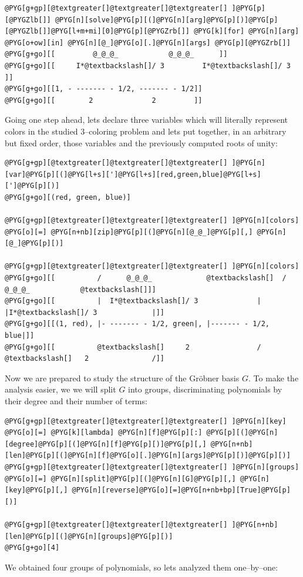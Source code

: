 \begin{Verbatim}[commandchars=@\[\]]
@PYG[g+gp][@textgreater[]@textgreater[]@textgreater[] ]@PYG[p][@PYGZlb[]] @PYG[n][solve]@PYG[p][(]@PYG[n][arg]@PYG[p][)]@PYG[p][@PYGZlb[]]@PYG[l+m+mi][0]@PYG[p][@PYGZrb[]] @PYG[k][for] @PYG[n][arg] @PYG[o+ow][in] @PYG[n][@_]@PYG[o][.]@PYG[n][args] @PYG[p][@PYGZrb[]]
@PYG[g+go][[         @_@_@_            @_@_@_      ]]
@PYG[g+go][[     I*@textbackslash[]/ 3         I*@textbackslash[]/ 3       ]]
@PYG[g+go][[1, - ------- - 1/2, ------- - 1/2]]
@PYG[g+go][[        2              2         ]]
\end{Verbatim}
\noindent
Going one step ahead, lets declare three variables which will literally represent colors in the studied
$3$--coloring problem and lets put together, in an arbitrary but fixed order, those variables and the
previously computed roots of unity:

\begin{Verbatim}[commandchars=@\[\]]
@PYG[g+gp][@textgreater[]@textgreater[]@textgreater[] ]@PYG[n][var]@PYG[p][(]@PYG[l+s][']@PYG[l+s][red,green,blue]@PYG[l+s][']@PYG[p][)]
@PYG[g+go][(red, green, blue)]

@PYG[g+gp][@textgreater[]@textgreater[]@textgreater[] ]@PYG[n][colors] @PYG[o][=] @PYG[n+nb][zip]@PYG[p][(]@PYG[n][@_@_]@PYG[p][,] @PYG[n][@_]@PYG[p][)]

@PYG[g+gp][@textgreater[]@textgreater[]@textgreater[] ]@PYG[n][colors]
@PYG[g+go][[          /      @_@_@_             @textbackslash[]  /    @_@_@_            @textbackslash[]]]
@PYG[g+go][[          |  I*@textbackslash[]/ 3              |  |I*@textbackslash[]/ 3             |]]
@PYG[g+go][[(1, red), |- ------- - 1/2, green|, |------- - 1/2, blue|]]
@PYG[g+go][[          @textbackslash[]     2                /  @textbackslash[]   2               /]]
\end{Verbatim}
\noindent
Now we are prepared to study the structure of the Gröbner basis $G$. To make the analysis easier, we
we will split $G$ into groups, discriminating polynomials by their degree and their number of terms:

\begin{Verbatim}[commandchars=@\[\]]
@PYG[g+gp][@textgreater[]@textgreater[]@textgreater[] ]@PYG[n][key] @PYG[o][=] @PYG[k][lambda] @PYG[n][f]@PYG[p][:] @PYG[p][(]@PYG[n][degree]@PYG[p][(]@PYG[n][f]@PYG[p][)]@PYG[p][,] @PYG[n+nb][len]@PYG[p][(]@PYG[n][f]@PYG[o][.]@PYG[n][args]@PYG[p][)]@PYG[p][)]
@PYG[g+gp][@textgreater[]@textgreater[]@textgreater[] ]@PYG[n][groups] @PYG[o][=] @PYG[n][split]@PYG[p][(]@PYG[n][G]@PYG[p][,] @PYG[n][key]@PYG[p][,] @PYG[n][reverse]@PYG[o][=]@PYG[n+nb+bp][True]@PYG[p][)]

@PYG[g+gp][@textgreater[]@textgreater[]@textgreater[] ]@PYG[n+nb][len]@PYG[p][(]@PYG[n][groups]@PYG[p][)]
@PYG[g+go][4]
\end{Verbatim}
\noindent
We obtained four groups of polynomials, so lets analyzed them one--by--one:

